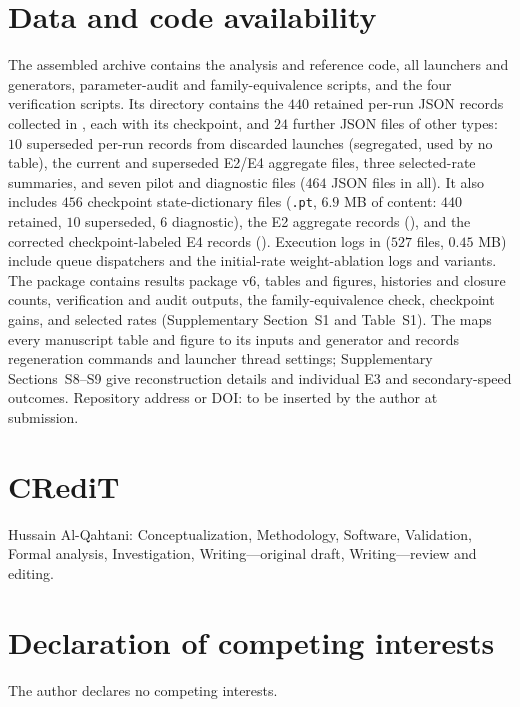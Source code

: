 \documentclass[11pt]{article}
\begin{document}
\section*{Data and code availability}
The assembled archive 
contains the analysis and reference code, all launchers and generators,
parameter-audit and family-equivalence scripts, and the four verification
scripts. Its  directory contains the $440$ retained
per-run JSON records collected in , each with its
checkpoint, and $24$ further JSON files of other types: $10$ superseded
per-run records from discarded launches (segregated, used by no table),
the current and superseded E2/E4 aggregate files, three selected-rate
summaries, and seven pilot and diagnostic files ($464$ JSON files in all).
It also includes $456$ checkpoint state-dictionary files (\texttt{.pt},
$6.9$ MB of content: $440$ retained, $10$ superseded, $6$ diagnostic), the E2
aggregate records (), and the corrected
checkpoint-labeled E4 records (). Execution logs in
 ($527$ files, $0.45$ MB) include queue dispatchers and the
initial-rate weight-ablation logs and variants. The package contains results package v6, tables and figures,
histories and closure counts, verification and audit outputs, the
family-equivalence check, checkpoint gains, and selected rates
(Supplementary Section~S1 and Table~S1). The 
maps every manuscript table and figure to its inputs and generator and
records regeneration commands and launcher thread settings; Supplementary
Sections~S8--S9 give reconstruction details and individual E3 and
secondary-speed outcomes. Repository address or DOI: to be inserted by
the author at submission.

\section*{CRediT}
Hussain Al-Qahtani: Conceptualization, Methodology, Software, Validation,
Formal analysis, Investigation, Writing---original draft,
Writing---review and editing.

\section*{Declaration of competing interests}
The author declares no competing interests.
\end{document}
